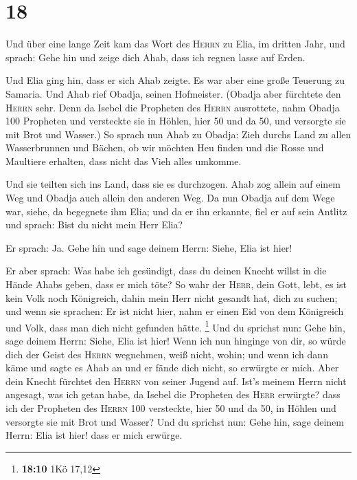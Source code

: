 \hypertarget{section-17}{%
\section{18}\label{section-17}}

 Und über eine lange Zeit kam das Wort des \textsc{Herrn}
zu Elia, im dritten Jahr, und sprach: Gehe hin und zeige dich Ahab, dass
ich regnen lasse auf Erden.

 Und Elia ging hin, dass er sich Ahab zeigte. Es war aber
eine große Teuerung zu Samaria.  Und Ahab rief Obadja,
seinen Hofmeister. (Obadja aber fürchtete den \textsc{Herrn} sehr.
 Denn da Isebel die Propheten des \textsc{Herrn}
ausrottete, nahm Obadja 100 Propheten und versteckte sie in Höhlen, hier
50 und da 50, und versorgte sie mit Brot und Wasser.)  So
sprach nun Ahab zu Obadja: Zieh durchs Land zu allen Wasserbrunnen und
Bächen, ob wir möchten Heu finden und die Rosse und Maultiere erhalten,
dass nicht das Vieh alles umkomme.

 Und sie teilten sich ins Land, dass sie es durchzogen.
Ahab zog allein auf einem Weg und Obadja auch allein den anderen Weg.
 Da nun Obadja auf dem Wege war, siehe, da begegnete ihm
Elia; und da er ihn erkannte, fiel er auf sein Antlitz und sprach: Bist
du nicht mein Herr Elia?

 Er sprach: Ja. Gehe hin und sage deinem Herrn: Siehe,
Elia ist hier!

 Er aber sprach: Was habe ich gesündigt, dass du deinen
Knecht willst in die Hände Ahabs geben, dass er mich töte?
 So wahr der \textsc{Herr}, dein Gott, lebt, es ist kein
Volk noch Königreich, dahin mein Herr nicht gesandt hat, dich zu suchen;
und wenn sie sprachen: Er ist nicht hier, nahm er einen Eid von dem
Königreich und Volk, dass man dich nicht gefunden hätte. \footnote{\textbf{18:10}
  1Kö 17,12}  Und du sprichst nun: Gehe hin, sage deinem
Herrn: Siehe, Elia ist hier!  Wenn ich nun hinginge von
dir, so würde dich der Geist des \textsc{Herrn} wegnehmen, weiß nicht,
wohin; und wenn ich dann käme und sagte es Ahab an und er fände dich
nicht, so erwürgte er mich. Aber dein Knecht fürchtet den \textsc{Herrn}
von seiner Jugend auf.  Ist's meinem Herrn nicht
angesagt, was ich getan habe, da Isebel die Propheten des \textsc{Herr}
erwürgte? dass ich der Propheten des \textsc{Herrn} 100 versteckte, hier
50 und da 50, in Höhlen und versorgte sie mit Brot und Wasser?
 Und du sprichst nun: Gehe hin, sage deinem Herrn: Elia
ist hier! dass er mich erwürge.

